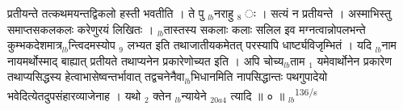 \documentclass[article,12pt,a4paper]{memoir}%
\newcounter{parCount}
\begin{document}
प्रतीयन्ते तत्कथमयन्तद्विकलो हस्ती भवतीति । ते पु {\tiny $_{lb}$}नराहु {\tiny $_{8}$} ः । सत्यं न प्रतीयन्ते । अस्माभिस्तु समाप्तसकलकलः करेणुरयं लिखितः । {\tiny $_{lb}$}तास्तस्य सकलाः कलाः सलिल इव मग्नत्वान्नोपलभन्ते कुम्भकदेशमात्र{\tiny $_{lb}$}न्त्विदमस्योप {\tiny $_{9}$} \leavevmode{} लभ्यत इति तथाजातीयकमेतत् परस्यापि धार्ष्ट्यविजृम्भितं । यदि {\tiny $_{lb}$}नाम नायमर्थोस्माद् बाह्यात् प्रतीयते तथाप्यनेन प्रकारेणोच्यत इति । अपि चोच्य{\tiny $_{lb}$}ताम {\tiny $_{1}$} यमेवार्थोनेन प्रकारेण तथाप्यसिद्धस्य हेत्वाभासेष्वन्तर्भावात् तद्वचनेनैवा{\tiny $_{lb}$}भिधानमिति नापसिद्धान्तः पथगुपादेयो भवेदित्येतदुपसंहारव्याजेनाह । {\color{DodgerBlue3}यथो {\tiny $_{2}$} क्तेन} {\tiny $_{lb}$}न्यायेने {\tiny $_{20a4}$} त्यादि ॥ ० ॥
	{}
	\pend%
      {\tiny $_{lb}$}\textsuperscript{\textenglish{136/s}}
\end{document}

